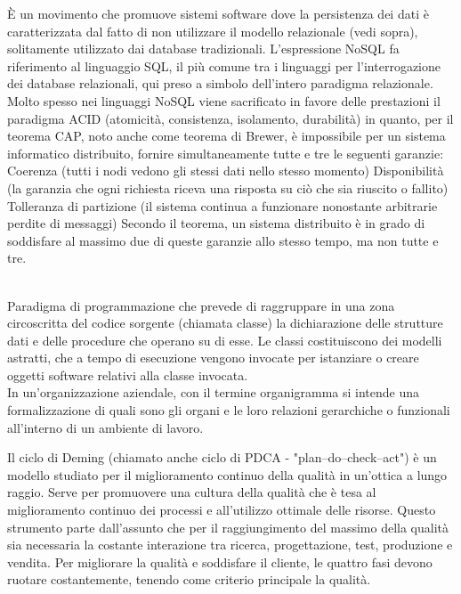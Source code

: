 \documentclass{scalatekids-article}
\begin{document}

   È un movimento che promuove sistemi software dove la persistenza dei dati è caratterizzata dal fatto di non utilizzare il modello relazionale (vedi sopra), solitamente utilizzato dai database tradizionali.
  L'espressione NoSQL fa riferimento al linguaggio SQL, il più comune tra i linguaggi per l'interrogazione dei database relazionali, qui preso a simbolo dell'intero paradigma relazionale. Molto spesso nei linguaggi NoSQL viene sacrificato in favore delle prestazioni il paradigma ACID (atomicità, consistenza, isolamento, durabilità) in quanto, per il teorema CAP, noto anche come teorema di Brewer, è impossibile per un sistema informatico distribuito, fornire simultaneamente tutte e tre le seguenti garanzie:
  Coerenza (tutti i nodi vedono gli stessi dati nello stesso momento)
  Disponibilità (la garanzia che ogni richiesta riceva una risposta su ciò che sia riuscito o fallito)
  Tolleranza di partizione (il sistema continua a funzionare nonostante arbitrarie perdite di messaggi)
  Secondo il teorema, un sistema distribuito è in grado di soddisfare al massimo due di queste garanzie allo stesso tempo, ma non tutte e tre.
  \\
  
  \\


   Paradigma di programmazione che prevede di raggruppare in una zona circoscritta del codice sorgente (chiamata classe) la dichiarazione delle strutture dati e delle procedure che operano su di esse. Le classi costituiscono dei modelli astratti, che a tempo di esecuzione vengono invocate per istanziare o creare oggetti software relativi alla classe invocata.
  \\

   In un'organizzazione aziendale, con il termine organigramma si intende una formalizzazione di quali sono gli organi e le loro relazioni gerarchiche o funzionali all'interno di un ambiente di lavoro.
  \\


   Il ciclo di Deming (chiamato anche ciclo di PDCA - "plan–do–check–act") è un modello studiato per il miglioramento continuo della qualità in un'ottica a lungo raggio. Serve per promuovere una cultura della qualità che è tesa al miglioramento continuo dei processi e all'utilizzo ottimale delle risorse. Questo strumento parte dall'assunto che per il raggiungimento del massimo della qualità sia necessaria la costante interazione tra ricerca, progettazione, test, produzione e vendita. Per migliorare la qualità e soddisfare il cliente, le quattro fasi devono ruotare costantemente, tenendo come criterio principale la qualità.
  \\
\end{document}
